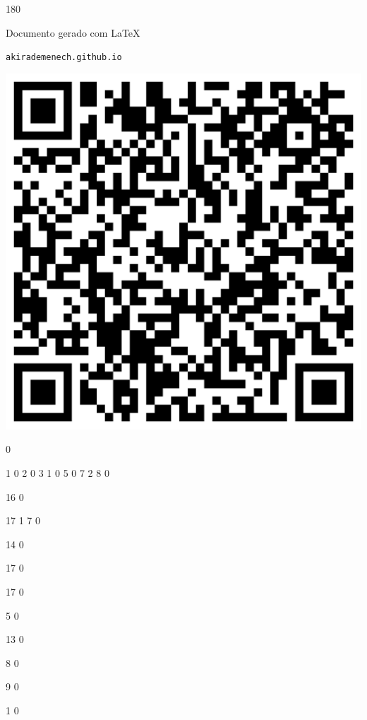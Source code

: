 \documentclass[12pt]{article}
\begin{document}
	\begin{turn}{180}	
		\begin{minipage}{\textwidth}		  
		  Documento gerado com \LaTeX			
		  
		  \texttt{akirademenech.github.io}

		  \includegraphics[height=0.3\textheight]{2e-2.pdf}

		\end{minipage}	
	\end{turn}  
		  
		\vfill  
		  
{
	0	%

	1	%
	0	%
	2	%
	0	%
	3	%
	1	%
	0	%
	5	%
	0	%
	7	%
	2	%
	8	%
	0	%

	16	%
	0	%

	17	%
	1	%
	7	%
	0	%

	14	%
	0	%

	17	%
	0	%

	17	%
	0	%

	5	%
	0	%

	13	%
	0	%

	8	%
	0	%

	9	%
	0	%

	1	%
	0	%

}	  
		    	
\end{document}
